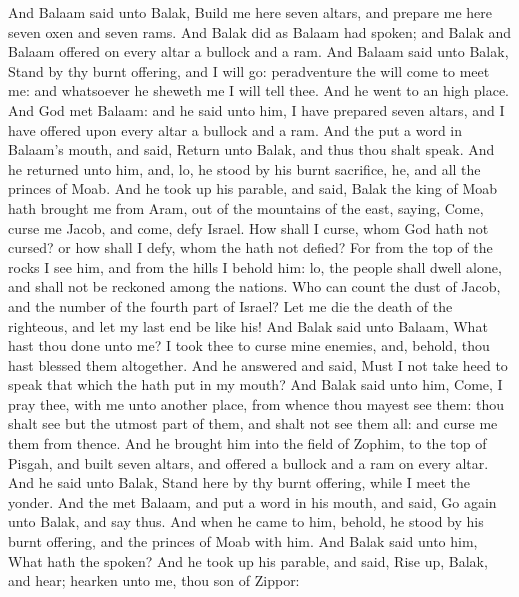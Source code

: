 \begin{biblechapter} %
 And Balaam said unto Balak, Build me here seven altars, and prepare me here seven oxen and seven rams.
\verse And Balak did as Balaam had spoken; and Balak and Balaam offered on every altar a bullock and a ram.
\verse And Balaam said unto Balak, Stand by thy burnt offering, and I will go: peradventure the \LORD will come to meet me: and whatsoever he sheweth me I will tell thee. And he went to an high place.
\verse And God met Balaam: and he said unto him, I have prepared seven altars, and I have offered upon every altar a bullock and a ram.
\verse And the \LORD put a word in Balaam's mouth, and said, Return unto Balak, and thus thou shalt speak.
\verse And he returned unto him, and, lo, he stood by his burnt sacrifice, he, and all the princes of Moab.
\verse And he took up his parable, and said, Balak the king of Moab hath brought me from Aram, out of the mountains of the east, saying, Come, curse me Jacob, and come, defy Israel.
\verse How shall I curse, whom God hath not cursed? or how shall I defy, whom the \LORD hath not defied?
\verse For from the top of the rocks I see him, and from the hills I behold him: lo, the people shall dwell alone, and shall not be reckoned among the nations.
\verse Who can count the dust of Jacob, and the number of the fourth part of Israel? Let me die the death of the righteous, and let my last end be like his!
\verse And Balak said unto Balaam, What hast thou done unto me? I took thee to curse mine enemies, and, behold, thou hast blessed them altogether.
\verse And he answered and said, Must I not take heed to speak that which the \LORD hath put in my mouth?
 And Balak said unto him, Come, I pray thee, with me unto another place, from whence thou mayest see them: thou shalt see but the utmost part of them, and shalt not see them all: and curse me them from thence.
\verse And he brought him into the field of Zophim, to the top of Pisgah, and built seven altars, and offered a bullock and a ram on every altar.
\verse And he said unto Balak, Stand here by thy burnt offering, while I meet the \LORD yonder.
\verse And the \LORD met Balaam, and put a word in his mouth, and said, Go again unto Balak, and say thus.
\verse And when he came to him, behold, he stood by his burnt offering, and the princes of Moab with him. And Balak said unto him, What hath the \LORD spoken?
\verse And he took up his parable, and said, Rise up, Balak, and hear; hearken unto me, thou son of Zippor:

\end{biblechapter}
